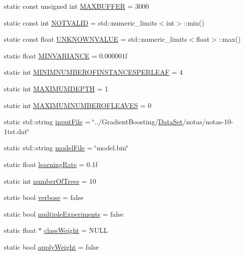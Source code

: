 \begin{DoxyCompactItemize}
\item 
static const unsigned int \hyperlink{class_config_ae23f99b425d9f9d6c3c68aa2e25abd56}{M\+A\+X\+B\+U\+F\+F\+E\+R} = 3000
\item 
static const int \hyperlink{class_config_a32d7d1aeb9a464a3f63a6b9b7f1806cf}{N\+O\+T\+V\+A\+L\+I\+D} = std\+::numeric\+\_\+limits$<$int$>$\+::min()
\item 
static const float \hyperlink{class_config_a249b25bbb5fd768cd74d66a6a4fbc71d}{U\+N\+K\+N\+O\+W\+N\+V\+A\+L\+U\+E} = std\+::numeric\+\_\+limits$<$float$>$\+::max()
\item 
static float \hyperlink{class_config_a547f053c22fce9ac721b3ca87fa7b480}{M\+I\+N\+V\+A\+R\+I\+A\+N\+C\+E} = 0.\+000001f
\item 
static int \hyperlink{class_config_addc209f97d86cae197637442bff9fcd8}{M\+I\+N\+I\+M\+N\+U\+M\+B\+E\+R\+O\+F\+I\+N\+S\+T\+A\+N\+C\+E\+S\+P\+E\+R\+L\+E\+A\+F} = 4
\item 
static int \hyperlink{class_config_a3e52deb4ca5e5667f316b00821ad0336}{M\+A\+X\+I\+M\+U\+M\+D\+E\+P\+T\+H} = 1
\item 
static int \hyperlink{class_config_ac80a17712ee71204bda45d26bf70fb58}{M\+A\+X\+I\+M\+U\+M\+N\+U\+M\+B\+E\+R\+O\+F\+L\+E\+A\+V\+E\+S} = 0
\item 
static std\+::string \hyperlink{class_config_a8deece1c6b9b4ba16f842ce58a38a40d}{input\+File} = \char`\"{}../Gradient\+Boosting/\hyperlink{class_data_set}{Data\+Set}/notas/notas-\/10-\/1tst.\+dat\char`\"{}
\item 
static std\+::string \hyperlink{class_config_a09d132272852d628f1c2bbf78e221df7}{model\+File} = \char`\"{}model.\+bin\char`\"{}
\item 
static float \hyperlink{class_config_ac0c4f426242f7c98f3cdfe0fc30a7383}{learning\+Rate} = 0.\+1f
\item 
static int \hyperlink{class_config_a137fe8f8b08b54e78e5d7db29cabda1a}{number\+Of\+Trees} = 10
\item 
static bool \hyperlink{class_config_a4b971d3db3a036f6c58fbb820f8a9d9a}{verbose} = false
\item 
static bool \hyperlink{class_config_aac65af86410e8a7f24a6eefa118a5f95}{multiple\+Experiments} = false
\item 
static float $\ast$ \hyperlink{class_config_acec10f764acbb3536a363b398837a3dd}{class\+Weight} = N\+U\+L\+L
\item 
static bool \hyperlink{class_config_a05bc5be7b4baf5cac2ded19641ccdcf3}{apply\+Weight} = false
\end{DoxyCompactItemize}


